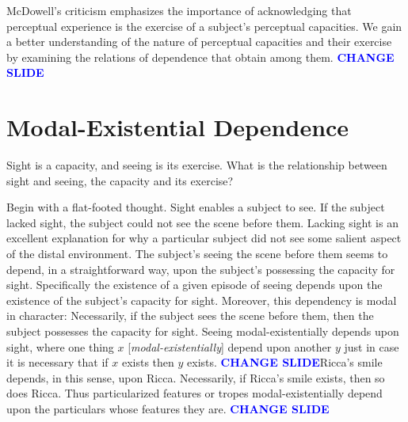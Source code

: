 \documentclass[12pt]{article}
\newcommand{\change}{\textcolor{blue}{\textbf{CHANGE SLIDE}}}
\begin{document}
McDowell's criticism emphasizes the importance of acknowledging that perceptual experience is the exercise of a subject's perceptual capacities. We gain a better understanding of the nature of perceptual capacities and their exercise by examining the relations of dependence that obtain among them. \change



\section{Modal-Existential Dependence} %
\label{sec:modal-existential_dependence}

Sight is a capacity, and seeing is its exercise. What is the relationship between sight and seeing, the capacity and its exercise?

Begin with a flat-footed thought. Sight enables a subject to see. If the subject lacked sight, the subject could not see the scene before them. Lacking sight is an excellent explanation for why a particular subject did not see some salient aspect of the distal environment. The subject's seeing the scene before them seems to depend, in a straightforward way, upon the subject's possessing the capacity for sight. Specifically the existence of a given episode of seeing depends upon the existence of the subject's capacity for sight. Moreover, this dependency is modal in character: Necessarily, if the subject sees the scene before them, then the subject possesses the capacity for sight. Seeing modal-existentially depends upon sight, where one thing \( x \) [\emph{modal-existentially}] depend upon another \( y \) just in case it is necessary that if \( x \) exists then \( y \) exists. \change Ricca's smile depends, in this sense, upon Ricca. Necessarily, if Ricca's smile exists, then so does Ricca. Thus particularized features or tropes modal-existen\-ti\-al\-ly depend upon the particulars whose features they are. \change
\end{document}
